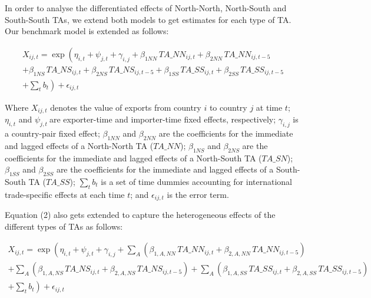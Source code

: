 In order to analyse the differentiated effects of North-North,
North-South and South-South TAs, we extend both models to get estimates
for each type of TA. Our benchmark model is extended as follows:

\begin{multline}
    X_{ij,t} = \exp\left(\eta_{i,t} + \psi_{j,t} + \gamma_{i,j} + \beta_{1NN} \, TA\_NN_{ij,t} + \beta_{2NN} \, TA\_NN_{ij,t-5} \right. \\
    + \beta_{1NS} \, TA\_NS_{ij,t} + \beta_{2NS} \, TA\_NS_{ij,t-5} + \beta_{1SS} \, TA\_SS_{ij,t} + \beta_{2SS} \, TA\_SS_{ij,t-5} \\
    + \left. \sum_{t} b_{t} \right) + \epsilon_{ij,t}
\end{multline}

Where \(X_{ij,t}\)\hspace{0pt} denotes the value of exports from country
\(i\) to country \(j\) at time \(t\); \(\eta_{i,t}\) and
\(\psi_{j,t}\ \)are exporter-time and importer-time fixed effects,
respectively; \(\gamma_{i,j}\) is a country-pair fixed effect;
\hspace{0pt}\(\beta_{1NN}\) and \(\beta_{2NN}\) are the coefficients for
the immediate and lagged effects of a North-North TA (\(TA\_ NN\));
\hspace{0pt}\hspace{0pt}\(\beta_{1NS}\) and \(\beta_{2NS}\) are the
coefficients for the immediate and lagged effects of a North-South TA
(\(TA\_ SN\)); \hspace{0pt}\hspace{0pt}\(\beta_{1SS}\) and
\(\beta_{2SS}\) are the coefficients for the immediate and lagged
effects of a South-South TA (\(TA\_ SS\)); \(\sum_{t}^{}b_{t}\) is a set
of time dummies accounting for international trade-specific effects at
each time \(t\); and \(\epsilon_{ij,t}\) is the error term.

Equation (2) also gets extended to capture the heterogeneous effects of
the different types of TAs as follows:

\begin{multline}
    X_{ij,t} = \exp\left(\eta_{i,t} + \psi_{j,t} + \gamma_{i,j} + \sum_{A}\left(\beta_{1,A,NN} \, TA\_NN_{ij,t} + \beta_{2,A,NN} \, TA\_NN_{ij,t-5}\right) \right. \\
    + \sum_{A}\left(\beta_{1,A,NS} \, TA\_NS_{ij,t} + \beta_{2,A,NS} \, TA\_NS_{ij,t-5}\right) + \sum_{A}\left(\beta_{1,A,SS} \, TA\_SS_{ij,t} + \beta_{2,A,SS} \, TA\_SS_{ij,t-5}\right) \\
    + \left. \sum_{t} b_{t} \right) + \epsilon_{ij,t}
\end{multline}

